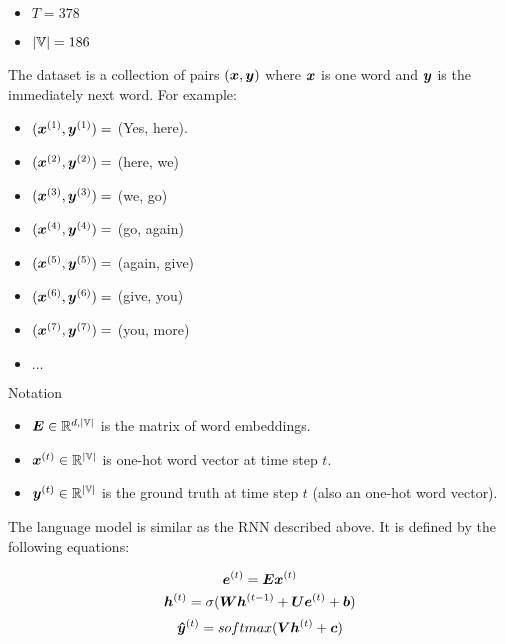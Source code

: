 \begin{itemize}
\item $T = 378$
\item $|\mathbb{V}| = 186$
\end{itemize}


The dataset is a collection of pairs $(\bm{x},\bm{y})$ where $\bm{x}$ is one word and $\bm{y}$ is the immediately next word. For example:
\begin{itemize}
\item [] $(\bm{x}^{(1)}, \bm{y}^{(1)}) =$ (Yes, here).
\item [] $(\bm{x}^{(2)}, \bm{y}^{(2)}) =$ (here, we)
\item [] $(\bm{x}^{(3)}, \bm{y}^{(3)}) =$ (we, go)
\item [] $(\bm{x}^{(4)}, \bm{y}^{(4)}) =$ (go, again)
\item [] $(\bm{x}^{(5)}, \bm{y}^{(5)}) =$ (again, give)
\item [] $(\bm{x}^{(6)}, \bm{y}^{(6)}) =$ (give, you)
\item [] $(\bm{x}^{(7)}, \bm{y}^{(7)}) =$ (you, more)
\item [] $\dots$
\end{itemize}

Notation

\begin{itemize}
\item $\bm{E} \in \mathbb{R}^{d,|\mathbb{V}|}$ is the matrix of word embeddings.
\vspace{0.3cm}
\item $\bm{x}^{(t)} \in \mathbb{R}^{|\mathbb{V}|}$ is one-hot word vector at time step $t$.
\vspace{0.3cm}
\item $\bm{y}^{(t)} \in \mathbb{R}^{|\mathbb{V}|}$ is the ground truth at time step $t$ (also an one-hot word vector).
\end{itemize}

The language model is similar as the RNN described above. It is defined by the following equations:

\begin{equation}
\bm{e}^{(t)} = \bm{E}\bm{x}^{(t)}
\end{equation}
\vspace{0.2cm}
 \begin{equation}
\bm{h}^{(t)} = \sigma(\bm{W}\bm{h}^{(t-1)}+ \bm{U}\bm{e}^{(t)}+ \bm{b})
\end{equation}
\vspace{0.2cm}
\begin{equation}
\bm{\hat{y}}^{(t)} = softmax(\bm{V}\bm{h}^{(t)} + \bm{c})
\end{equation}



